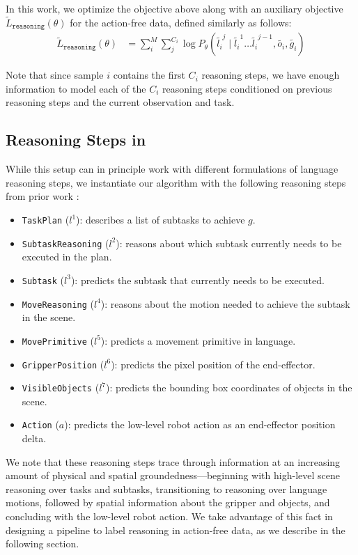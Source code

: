 In this work, we optimize the objective above along with an auxiliary objective $\tilde{L}_{\texttt{reasoning}}(\theta)$ for the action-free data, defined similarly as follows:
\begin{align*}
    \tilde{L}_{\texttt{reasoning}}(\theta)& = \sum_i^M \sum_j^{C_i} \log P_\theta(\tilde{l_i}^j \mid \tilde{l_i}^1\dots \tilde{l_i}^{j-1},\tilde{o_i},\tilde{g_i})
\end{align*}

Note that since sample $i$ contains the first $C_i$ reasoning steps, we have enough information to model each of the $C_i$ reasoning steps conditioned on previous reasoning steps and the current observation and task. 

\subsection{Reasoning Steps in \ACRO}

While this setup can in principle work with different formulations of language reasoning steps, we instantiate our algorithm with the following reasoning steps from prior work \cite{zawalski2024robotic}:
\begin{itemize}
    \item \texttt{TaskPlan} ($l^1$): describes a list of subtasks to achieve $g$.
    \item \texttt{SubtaskReasoning} ($l^2$): reasons about which subtask currently needs to be executed in the plan.
    \item \texttt{Subtask} ($l^3$): predicts the subtask that currently needs to be executed.
    \item \texttt{MoveReasoning} ($l^4$): reasons about the motion needed to achieve the subtask in the scene.
    \item \texttt{MovePrimitive} ($l^5$): predicts a movement primitive in language.
    \item \texttt{GripperPosition} ($l^6$): predicts the pixel position of the end-effector.
    \item \texttt{VisibleObjects} ($l^7$): predicts the bounding box coordinates of objects in the scene.
    \item \texttt{Action} ($a$): predicts the low-level robot action as an end-effector position delta.
\end{itemize}

We note that these reasoning steps trace through information at an increasing amount of physical and spatial groundedness---beginning with high-level scene reasoning over tasks and subtasks, transitioning to reasoning over language motions, followed by spatial information about the gripper and objects, and concluding with the low-level robot action. We take advantage of this fact in designing a pipeline to label reasoning in action-free data, as we describe in the following section.

